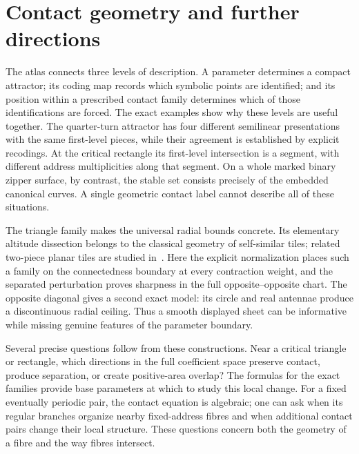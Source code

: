 \section{Contact geometry and further directions}
\label{sec:discussion}

The atlas connects three levels of description. A parameter determines a compact
attractor; its coding map records which symbolic points are identified; and its
position within a prescribed contact family determines which of those
identifications are forced. The exact examples show why these levels are useful
together. The quarter-turn attractor has four different semilinear presentations
with the same first-level pieces, while their agreement is established by
explicit recodings. At the critical rectangle its first-level intersection is a
segment, with different address multiplicities along that segment. On a whole marked binary zipper
surface, by contrast, the stable set consists precisely of the embedded
canonical curves. A single geometric contact label cannot describe all of these
situations.

The triangle family makes the universal radial bounds concrete. Its elementary
altitude dissection belongs to the classical geometry of self-similar tiles;
related two-piece planar tiles are studied in~\cite{NgaiSirventVeermanWang2000}.
Here the explicit normalization places such a family on the connectedness
boundary at every contraction weight, and the separated perturbation proves
sharpness in the full opposite--opposite chart. The opposite diagonal gives a
second exact model: its circle and real antennae produce a discontinuous radial
ceiling. Thus a smooth displayed sheet can be informative while missing genuine
features of the parameter boundary.

Several precise questions follow from these constructions. Near a critical
triangle or rectangle, which directions in the full coefficient space preserve
contact, produce separation, or create positive-area overlap? The formulas for
the exact families provide base parameters at which to study this local change.
For a fixed eventually periodic pair, the contact equation is algebraic; one
can ask when its regular branches organize nearby fixed-address fibres and when
additional contact pairs change their local structure. These questions concern
both the geometry of a fibre and the way fibres intersect.

